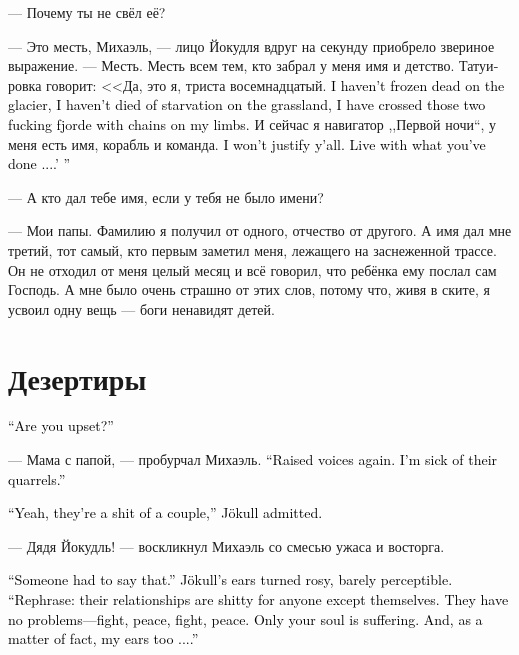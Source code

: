 \documentclass[a4paper,12pt,fleqn]{book}\usepackage{cooltooltips}\usepackage{polyglossia}\setdefaultlanguage[babelshorthands=true]{russian}\setotherlanguage{english}\defaultfontfeatures{Ligatures=TeX,Mapping=tex-text} \usepackage{xcolor}\definecolor{lightgray}{HTML}{bbbbbb}\color{lightgray}\newcommand{\ml}[3]{\textenglish{\textcolor{black}{#3}}}
\begin{document}
--- Почему ты не свёл её?

--- Это месть, Михаэль, --- лицо Йокудля вдруг на секунду приобрело звериное выражение.
--- Месть.
Месть всем тем, кто забрал у меня имя и детство.
Татуировка говорит: <<Да, это я, триста восемнадцатый.
\ml{$0$}
{Я не умер от холода на леднике, я не сдох от голода в степи, я переплыл те два гребаных фьорда, скованный цепями по рукам и ногам.}
{I haven't frozen dead on the glacier, I haven't died of starvation on the grassland, I have crossed those two fucking fjorde with chains on my limbs.}
И сейчас я навигатор ,,Первой ночи``, у меня есть имя, корабль и команда.
\ml{$0$}
{Я не буду вас оправдывать.}
{I won't justify y'all.}
\ml{$0$}
{Живите с тем, что вы сделали...>>}
{Live with what you've done ....' ''}

--- А кто дал тебе имя, если у тебя не было имени?

--- Мои папы.
Фамилию я получил от одного, отчество от другого.
А имя дал мне третий, тот самый, кто первым заметил меня, лежащего на заснеженной трассе.
Он не отходил от меня целый месяц и всё говорил, что ребёнка ему послал сам Господь.
А мне было очень страшно от этих слов, потому что, живя в ските, я усвоил одну вещь --- боги ненавидят детей.

\section{Дезертиры}

\ml{$0$}
{--- Ты чем-то опечален?}
{``Are you upset?''}

--- Мама с папой, --- пробурчал Михаэль.
\ml{$0$}
{--- Опять разговор на повышенных тонах.}
{``Raised voices again.}
\ml{$0$}
{Терпеть не могу эти их скандалы.}
{I'm sick of their quarrels.''}

\ml{$0$}
{--- Да, пара из них дерьмовая, --- признал Йокудль.}
{``Yeah, they're a shit of a couple,'' Jökull admitted.}

--- Дядя Йокудль! --- воскликнул Михаэль со смесью ужаса и восторга.

\ml{$0$}
{--- Кто-то должен был это сказать вслух, --- уши Йокудля едва заметно порозовели.}
{``Someone had to say that.'' Jökull's ears turned rosy, barely perceptible.}
\ml{$0$}
{--- Вернее, дерьмовая она для всех, кроме них.}
{``Rephrase: their relationships are shitty for anyone except themselves.}
\ml{$0$}
{Им хорошо --- поругались, помирились, поругались, помирились.}
{They have no problems---fight, peace, fight, peace.}
\ml{$0$}
{Страдает только твоя душа.}
{Only your soul is suffering.}
\ml{$0$}
{И мои уши, если честно, тоже...}
{And, as a matter of fact, my ears too ....''}
\end{document}
